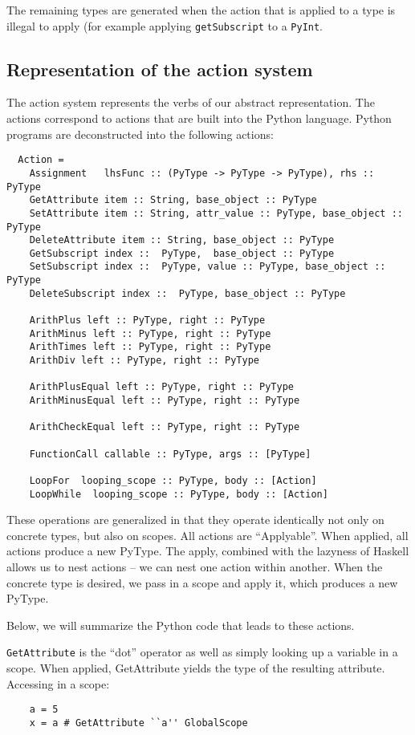 \documentclass{article}[12pt]
\begin{document}
The remaining types are generated when the action that is applied to a type is illegal to apply (for
example applying \verb=getSubscript= to a \verb=PyInt=.

\subsection{Representation of the action system}
The action system represents the verbs of our abstract representation. The actions correspond to
actions that are built into the Python language. Python programs are
deconstructed into the following actions:
\begin{verbatim}
  Action =
    Assignment   lhsFunc :: (PyType -> PyType -> PyType), rhs :: PyType
    GetAttribute item :: String, base_object :: PyType 
    SetAttribute item :: String, attr_value :: PyType, base_object :: PyType 
    DeleteAttribute item :: String, base_object :: PyType
    GetSubscript index ::  PyType,  base_object :: PyType 
    SetSubscript index ::  PyType, value :: PyType, base_object :: PyType 
    DeleteSubscript index ::  PyType, base_object :: PyType 

    ArithPlus left :: PyType, right :: PyType 
    ArithMinus left :: PyType, right :: PyType 
    ArithTimes left :: PyType, right :: PyType
    ArithDiv left :: PyType, right :: PyType 

    ArithPlusEqual left :: PyType, right :: PyType
    ArithMinusEqual left :: PyType, right :: PyType

    ArithCheckEqual left :: PyType, right :: PyType

    FunctionCall callable :: PyType, args :: [PyType]

    LoopFor  looping_scope :: PyType, body :: [Action]
    LoopWhile  looping_scope :: PyType, body :: [Action]
\end{verbatim}

These operations are generalized in that they operate identically not only on concrete types, but
also on scopes. All actions are ``Applyable''. When applied, all actions produce a new PyType. The apply, combined with
the lazyness of Haskell allows us to nest actions -- we can nest one action within another. When the
concrete type is desired, we pass in a scope and apply it, which
produces a new PyType.

Below, we will summarize the Python code that leads to these actions.

\verb=GetAttribute= is the ``dot'' operator as well as simply looking up a variable in a scope. When
applied, GetAttribute yields the type of the resulting attribute.
Accessing in a scope:
\begin{verbatim}
    a = 5
    x = a # GetAttribute ``a'' GlobalScope
\end{verbatim}
\end{document}
